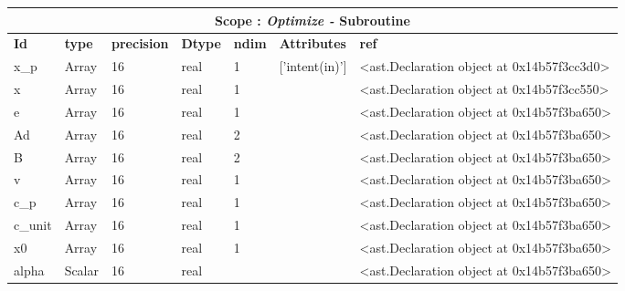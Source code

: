 \documentclass{report}
\begin{document}
\begin{center}
\begin{longtable}{|p{3.5cm}|p{1.5cm}|p{1.5cm}|p{1.5cm}|p{1cm}|p{2cm}|p{4cm}| }
\hline
\multicolumn{7}{|c|}{\textbf{Scope : \qquad}  \textbf{\textit{Optimize - }Subroutine}}\\ 
\hline
\textbf{Id} & \textbf{type} & \textbf{precision} & \textbf{Dtype} & \textbf{ndim} & \textbf{Attributes} & \textbf{ref} \\\hline

x\_p & Array & 16 & real & 1 & ['intent(in)'] & <ast.Declaration object at 0x14b57f3cc3d0> \\\hline

x & Array & 16 & real & 1 &  & <ast.Declaration object at 0x14b57f3cc550> \\\hline

e & Array & 16 & real & 1 &  & <ast.Declaration object at 0x14b57f3ba650> \\\hline

Ad & Array & 16 & real & 2 &  & <ast.Declaration object at 0x14b57f3ba650> \\\hline

B & Array & 16 & real & 2 &  & <ast.Declaration object at 0x14b57f3ba650> \\\hline

v & Array & 16 & real & 1 &  & <ast.Declaration object at 0x14b57f3ba650> \\\hline

c\_p & Array & 16 & real & 1 &  & <ast.Declaration object at 0x14b57f3ba650> \\\hline

c\_unit & Array & 16 & real & 1 &  & <ast.Declaration object at 0x14b57f3ba650> \\\hline

x0 & Array & 16 & real & 1 &  & <ast.Declaration object at 0x14b57f3ba650> \\\hline

alpha & Scalar & 16 & real &  &  & <ast.Declaration object at 0x14b57f3ba650> \\\hline

\end{longtable}
\end{center}

 \vspace{1cm}
\end{document}
